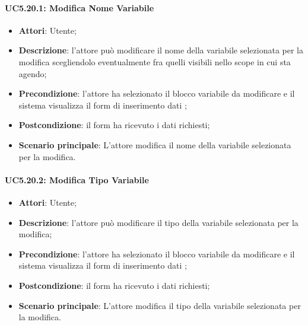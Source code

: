\paragraph{UC5.20.1: Modifica Nome Variabile}
\label{UC5.20.1}
\begin{itemize}
\item \textbf{Attori}: Utente;
\item \textbf{Descrizione}: l'attore può modificare il nome della variabile selezionata per la modifica scegliendolo eventualmente fra quelli visibili nello scope in cui sta agendo;
\item \textbf{Precondizione}: l'attore ha selezionato il blocco variabile da modificare e il sistema visualizza il form di inserimento dati ;	
\item \textbf{Postcondizione}: il form ha ricevuto i dati richiesti;	
\item \textbf{Scenario principale}:
L'attore modifica il nome della variabile selezionata per la modifica.	
\end{itemize}
\paragraph{UC5.20.2: Modifica Tipo Variabile}
\label{UC5.20.2}
\begin{itemize}
\item \textbf{Attori}: Utente;
\item \textbf{Descrizione}: l'attore può modificare il tipo della variabile selezionata per la modifica;
\item \textbf{Precondizione}: l'attore ha selezionato il blocco variabile da modificare e il sistema visualizza il form di inserimento dati ;	
\item \textbf{Postcondizione}: il form ha ricevuto i dati richiesti;	
\item \textbf{Scenario principale}:
L'attore modifica il tipo della variabile selezionata per la modifica.
\end{itemize}	

